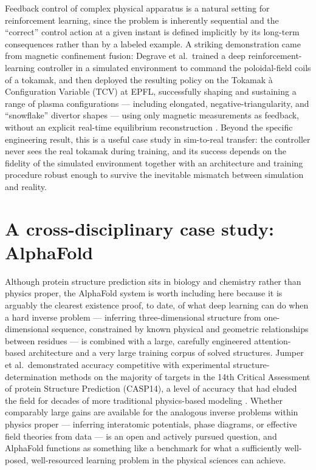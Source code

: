 \documentclass[11pt]{article}
\begin{document}
Feedback control of complex physical apparatus is a natural setting for reinforcement learning, since the problem is inherently sequential and the ``correct'' control action at a given instant is defined implicitly by its long-term consequences rather than by a labeled example. A striking demonstration came from magnetic confinement fusion: Degrave et al.\ trained a deep reinforcement-learning controller in a simulated environment to command the poloidal-field coils of a tokamak, and then deployed the resulting policy on the Tokamak \`a Configuration Variable (TCV) at EPFL, successfully shaping and sustaining a range of plasma configurations --- including elongated, negative-triangularity, and ``snowflake'' divertor shapes --- using only magnetic measurements as feedback, without an explicit real-time equilibrium reconstruction \cite{degrave2022}. Beyond the specific engineering result, this is a useful case study in sim-to-real transfer: the controller never sees the real tokamak during training, and its success depends on the fidelity of the simulated environment together with an architecture and training procedure robust enough to survive the inevitable mismatch between simulation and reality.

\section{A cross-disciplinary case study: AlphaFold}
\label{sec:alphafold}

Although protein structure prediction sits in biology and chemistry rather than physics proper, the AlphaFold system is worth including here because it is arguably the clearest existence proof, to date, of what deep learning can do when a hard inverse problem --- inferring three-dimensional structure from one-dimensional sequence, constrained by known physical and geometric relationships between residues --- is combined with a large, carefully engineered attention-based architecture and a very large training corpus of solved structures. Jumper et al.\ demonstrated accuracy competitive with experimental structure-determination methods on the majority of targets in the 14th Critical Assessment of protein Structure Prediction (CASP14), a level of accuracy that had eluded the field for decades of more traditional physics-based modeling \cite{jumper2021}. Whether comparably large gains are available for the analogous inverse problems within physics proper --- inferring interatomic potentials, phase diagrams, or effective field theories from data --- is an open and actively pursued question, and AlphaFold functions as something like a benchmark for what a sufficiently well-posed, well-resourced learning problem in the physical sciences can achieve.
\end{document}

